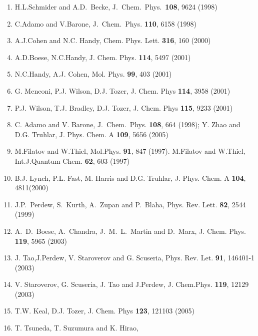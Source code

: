 {\begin{enumerate}
\item  H.L.Schmider and A.D.~Becke, J.~Chem.~Phys.~{\bf 108},
9624 (1998)\\
\item C.Adamo and V.Barone, J.~Chem.~Phys. {\bf 110}, 6158 (1998)\\
\item  A.J.Cohen and N.C. Handy, Chem. Phys. Lett. {\bf 316}, 160 (2000)\\
\item  A.D.Boese,  N.C.Handy, J. Chem. Phys. {\bf 114}, 5497
(2001)\\
\item  N.C.Handy, A.J. Cohen, Mol. Phys. {\bf 99}, 403 (2001)\\
\item G. Menconi, P.J. Wilson, D.J. Tozer, 
J. Chem. Phys {\bf 114}, 3958 (2001)\\
\item  P.J. Wilson, T.J. Bradley, D.J. Tozer, J. Chem. Phys {\bf 115}, 
9233 (2001)\\
\item C. Adamo and V. Barone, J.~Chem.~Phys. {\bf 108}, 664 (1998); Y. Zhao and D.G. Truhlar, J. Phys. Chem. A {\bf 109}, 5656 (2005)\\
\item M.Filatov and W.Thiel, Mol.Phys. {\bf 91}, 847 (1997).
 M.Filatov and W.Thiel, Int.J.Quantum Chem. {\bf 62}, 603 (1997)\\
\item B.J. Lynch, P.L. Fast, M. Harris and D.G. Truhlar, J. Phys. Chem. A
{\bf 104}, 4811(2000)\\
\item  J.P.~Perdew, S.~Kurth, A.~Zupan and P.~Blaha, 
Phys. Rev. Lett. {\bf 82}, 2544 (1999)\\
\item A.~D.~Boese, A.~Chandra, J.~M.~L.~Martin and D.~Marx,
  J. Chem. Phys. {\bf 119}, 5965 (2003)\\
\item J. Tao,J.Perdew, V. Staroverov and G. Scuseria,
Phys. Rev. Let. {\bf 91}, 146401-1 (2003)\\
\item V. Staroverov, G. Scuseria,
J. Tao and J.Perdew, J. Chem.Phys. {\bf 119}, 12129 (2003)\\
\item  T.W. Keal, D.J. Tozer, J. Chem. Phys {\bf 123}, 
121103 (2005)\\
\item T. Tsuneda, T. Suzumura and K. Hirao,

\end{enumerate}}
